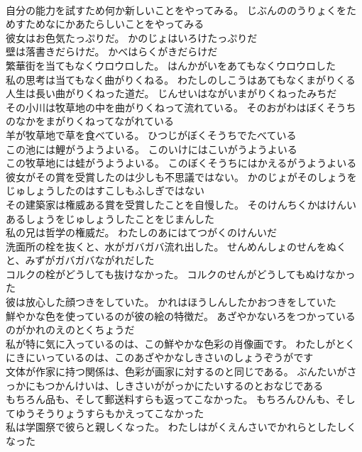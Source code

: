\documentclass[8pt]{extreport}
\begin{document}
\begin{CJK}{UTF8}{min}
\\	自分の能力を試すため何か新しいことをやってみる。	じぶんののうりょくをためすためなにかあたらしいことをやってみる 
\\	彼女はお色気たっぷりだ。	かのじょはいろけたっぷりだ 
\\	壁は落書きだらけだ。	かべはらくがきだらけだ 
\\	繁華街を当てもなくウロウロした。	はんかがいをあてもなくウロウロした 
\\	私の思考は当てもなく曲がりくねる。	わたしのしこうはあてもなくまがりくる 
\\	人生は長い曲がりくねった道だ。	じんせいはながいまがりくねったみちだ 
\\	その小川は牧草地の中を曲がりくねって流れている。	そのおがわはぼくそうちのなかをまがりくねってながれている 
\\	羊が牧草地で草を食べている。	ひつじがぼくそうちでたべている 
\\	この池には鯉がうようよいる。	このいけにはこいがうようよいる 
\\	この牧草地には蛙がうようよいる。	このぼくそうちにはかえるがうようよいる 
\\	彼女がその賞を受賞したのは少しも不思議ではない。	かのじょがそのしょうをじゅしょうしたのはすこしもふしぎではない 
\\	その建築家は権威ある賞を受賞したことを自慢した。	そのけんちくかはけんいあるしょうをじゅしょうしたことをじまんした 
\\	私の兄は哲学の権威だ。	わたしのあにはてつがくのけんいだ 
\\	洗面所の栓を抜くと、水がガバガバ流れ出した。	せんめんしょのせんをぬくと、みずがガバガバながれだした 
\\	コルクの栓がどうしても抜けなかった。	コルクのせんがどうしてもぬけなかった 
\\	彼は放心した顔つきをしていた。	かれはほうしんしたかおつきをしていた 
\\	鮮やかな色を使っているのが彼の絵の特徴だ。	あざやかないろをつかっているのがかれのえのとくちょうだ 
\\	私が特に気に入っているのは、この鮮やかな色彩の肖像画です。	わたしがとくにきにいっているのは、このあざやかなしきさいのしょうぞうがです 
\\	文体が作家に持つ関係は、色彩が画家に対するのと同じである。	ぶんたいがさっかにもつかんけいは、しきさいががっかにたいするのとおなじである 
\\	もちろん品も、そして郵送料すらも返ってこなかった。	もちろんひんも、そしてゆうそうりょうすらもかえってこなかった 
\\	私は学園祭で彼らと親しくなった。	わたしはがくえんさいでかれらとしたしくなった 

\end{CJK}
\end{document}
